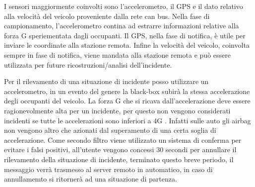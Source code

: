 \documentclass[12pt, a4paper, italian]{report}
\numberwithin{figure}{chapter}
\numberwithin{table}{chapter}
\begin{document}
I sensori maggiormente coinvolti sono l'accelerometro, il GPS e il dato relativo alla velocità del veicolo proveniente dalla rete can bus. Nella fase di campionamento, l'accelerometro contina ad estrarre informazioni relative alla forza G speriementata dagli occupanti. Il GPS, nella fase di notifica, è utile per inviare le coordinate alla stazione remota. Infine la velocità del veicolo, coinvolta sempre in fase di notifica, viene mandata alla stazione remota e può essere utilizzata per future ricostruzioni/analisi dell'incidente. \cite{shubham2021survey}

Per il rilevamento di una situazione di incidente posso utilizzare un accelerometro, in un evento del genere la black-box subirà la stessa accelerazione degli occupanti del veicolo. La forza G che si ricava dall'accelerazione deve essere ragionevolmente alta per un incidente, per questo non vengono considerati incidenti se tutte le accelerazioni sono inferiori a 4G \cite{thompson2010using}. Infatti sulle auto gli airbag non vengono altro che azionati dal superamento di una certa soglia di accelerazione. Come secondo filtro viene utilizzato un sistema di conferma per evitare i falsi positivi, all'utente vengono concessi 30 secondi per annullare il rilevamento della situazione di incidente, terminato questo breve periodo, il messaggio verrà trasmesso al server remoto in automatico, in caso di annullamemto si ritornerà ad una situazione di partenza.
\end{document}
